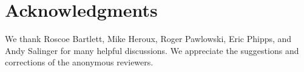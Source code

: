 \documentclass[acmtoms,acmnow]{acmtrans2m}
\begin{document}
% 
% 
% 

\section{Acknowledgments}

We thank Roscoe Bartlett, Mike Heroux, Roger Pawlowski, Eric Phipps, and Andy Salinger for
many helpful discussions. We appreciate the suggestions and corrections of the anonymous
reviewers.





\begin{received}
\end{received}
\end{document}
